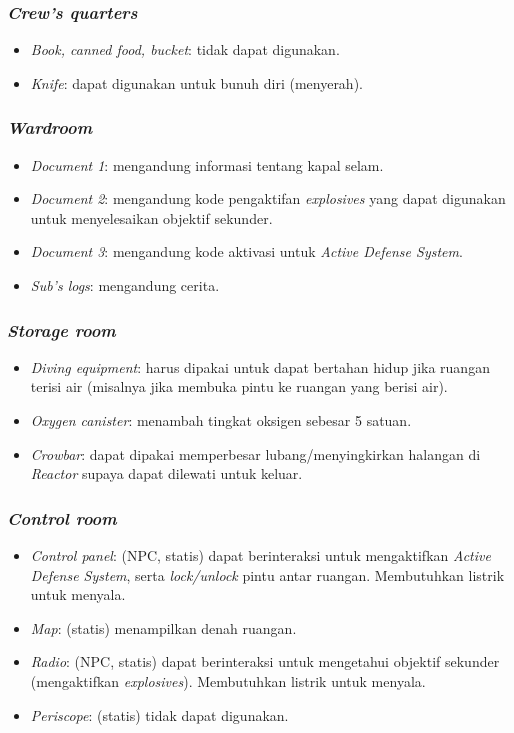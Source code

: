 \documentclass[a4paper,titlepage]{article}
\begin{document}
			\subsubsection{\textit{Crew's quarters}}
			\begin{itemize}
				\item \textit{Book, canned food, bucket}: tidak dapat digunakan.
				\item \textit{Knife}: dapat digunakan untuk bunuh diri (menyerah).
			\end{itemize}

			\subsubsection{\textit{Wardroom}}
			\begin{itemize}
				\item \textit{Document 1}: mengandung informasi tentang kapal selam.
				\item \textit{Document 2}: mengandung kode pengaktifan \textit{explosives} yang dapat digunakan untuk menyelesaikan objektif sekunder.
				\item \textit{Document 3}: mengandung kode aktivasi untuk \textit{Active Defense System}.
				\item \textit{Sub's logs}: mengandung cerita.
			\end{itemize}

			\subsubsection{\textit{Storage room}}
			\begin{itemize}
				\item \textit{Diving equipment}: harus dipakai untuk dapat bertahan hidup jika ruangan terisi air (misalnya jika membuka pintu ke ruangan yang berisi air).
				\item \textit{Oxygen canister}: menambah tingkat oksigen sebesar 5 satuan.
				\item \textit{Crowbar}: dapat dipakai memperbesar lubang/menyingkirkan halangan di \textit{Reactor} supaya dapat dilewati untuk keluar.
			\end{itemize}

			\subsubsection{\textit{Control room}}
			\begin{itemize}
				\item \textit{Control panel}: (NPC, statis) dapat berinteraksi untuk mengaktifkan \textit{Active Defense System}, serta \textit{lock/unlock} pintu antar ruangan. Membutuhkan listrik untuk menyala.
				\item \textit{Map}: (statis) menampilkan denah ruangan.
				\item \textit{Radio}: (NPC, statis) dapat berinteraksi untuk mengetahui objektif sekunder (mengaktifkan \textit{explosives}). Membutuhkan listrik untuk menyala.
				\item \textit{Periscope}: (statis) tidak dapat digunakan.
			\end{itemize}
\end{document}
